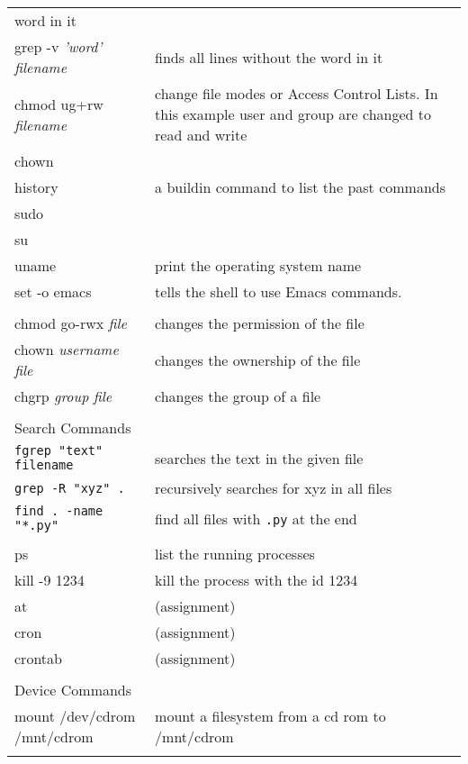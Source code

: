 \begin{center}
\begin{longtable}{|p{4cm}|p{8cm}|}
  word in it\\
  grep -v \textit{'word'} \textit{filename} & finds all lines without the
  word in it\\
  chmod ug+rw \textit{filename} & change file modes or Access Control
  Lists. In this example user and group are changed to read and write\\
  chown & \\
  history & a buildin command to list the past commands\\
  sudo & \\
  su & \\
  uname & print the operating system name\\
  set -o emacs & tells the shell to use Emacs commands.\\
  & \\
  
  chmod go-rwx \textit{file} & changes the permission of the file \\
  chown \textit{username} \textit{file} & changes the ownership of the file \\
  chgrp \textit{group} \textit{file} & changes the group of a file\\
  & \\

  \hline
  \multicolumn{2}{|l|}{\cellcolor{blue!15} Search Commands}\\
  \hline
  \verb|fgrep "text" filename| &  searches the text in the given file \\
  \verb|grep -R "xyz" .| & recursively searches for xyz in all files \\
  \verb|find . -name "*.py"| &  find all files with \verb|.py| at the end \\
  & \\

  ps & list the running processes \\
  kill -9 1234 & kill the process with the id 1234 \\
  at &  (assignment) \\
  cron &  (assignment) \\
  crontab &  (assignment) \\
  & \\

  \hline
  \multicolumn{2}{|l|}{\cellcolor{blue!15} Device Commands}\\
  \hline
  mount /dev/cdrom /mnt/cdrom & mount a filesystem from a cd rom to /mnt/cdrom\\
  & \\


\end{longtable}
\end{center}
